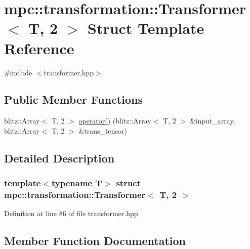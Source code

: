 \hypertarget{structmpc_1_1transformation_1_1_transformer_3_01_t_00_012_01_4}{}\section{mpc\+:\+:transformation\+:\+:Transformer$<$ T, 2 $>$ Struct Template Reference}
\label{structmpc_1_1transformation_1_1_transformer_3_01_t_00_012_01_4}


{\ttfamily \#include $<$transformer.\+hpp$>$}

\subsection*{Public Member Functions}
\begin{DoxyCompactItemize}
\item 
blitz\+::\+Array$<$ T, 2 $>$ \mbox{\hyperlink{structmpc_1_1transformation_1_1_transformer_3_01_t_00_012_01_4_a44bc51e51ca27b5a28827736bb321361}{operator()}} (blitz\+::\+Array$<$ T, 2 $>$ \&input\+\_\+array, blitz\+::\+Array$<$ T, 2 $>$ \&trans\+\_\+tensor)
\end{DoxyCompactItemize}


\subsection{Detailed Description}
\subsubsection*{template$<$typename T$>$\newline
struct mpc\+::transformation\+::\+Transformer$<$ T, 2 $>$}



Definition at line 86 of file transformer.\+hpp.



\subsection{Member Function Documentation}
\mbox{\label{structmpc_1_1transformation_1_1_transformer_3_01_t_00_012_01_4_a44bc51e51ca27b5a28827736bb321361}} 
